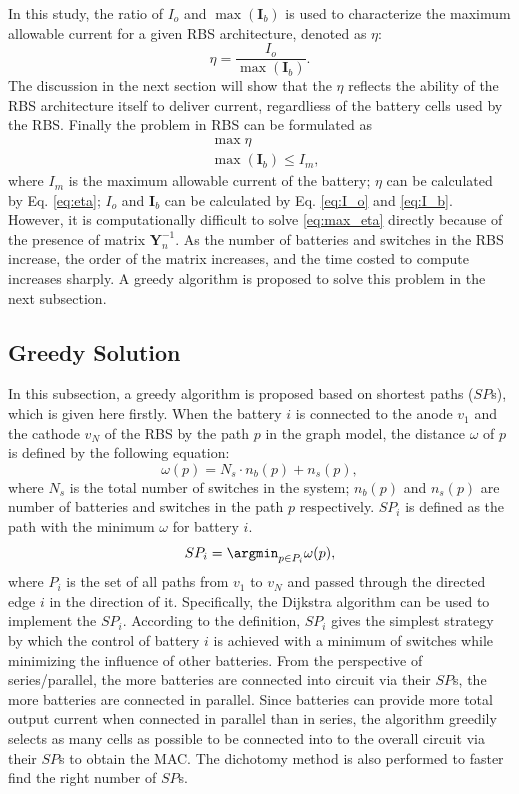 \documentclass{article}
\begin{document}
In this study, the ratio of $I_o$ and $\max (\bm{I}_b)$ is used to characterize the maximum allowable current for a given RBS architecture, denoted as $\eta$:
\begin{equation}\label{eq:eta}
    \eta = \frac{I_o}{\max (\bm{I}_b)}.
\end{equation}
The discussion in the next section will show that the $\eta$ reflects the ability of the RBS architecture itself to deliver current, regardliess of the battery cells used by the RBS.
Finally the problem in RBS can be formulated as
\begin{align}\label{eq:max_eta}
    & \max \eta \label{eq:max_eta}\\
    & \max (\bm{I}_b) \leq I_m,
\end{align}
where $I_m$ is the maximum allowable current of the battery; $\eta$ can be calculated by Eq. \ref{eq:eta}; $I_o$ and $\bm{I}_b$ can be calculated by Eq. \ref{eq:I_o} and \ref{eq:I_b}.
However, it is computationally difficult to solve \ref{eq:max_eta} directly because of the presence of matrix $\bm{Y}_n^{-1}$.
As the number of batteries and switches in the RBS increase, the order of the matrix increases, and the time costed to compute increases sharply.
A greedy algorithm is proposed to solve this problem in the next subsection.


\subsection{Greedy Solution}

In this subsection, a greedy algorithm is proposed based on shortest paths ($SP$s), which is given here firstly.
When the battery $i$ is connected to the anode $v_1$ and the cathode $v_N$ of the RBS by the path $p$ in the graph model, the distance $\omega$ of $p$ is defined by the following equation:
\begin{equation}\label{eq:weight}
    \omega(p) = N_s \cdot n_b (p) + n_s (p),
\end{equation}
where $N_s$ is the total number of switches in the system; $n_b(p)$ and $n_s(p)$ are number of batteries and switches in the path $p$ respectively.
$SP_i$ is defined as the path with the minimum $\omega$ for battery $i$.
\begin{equation}
    SP_i = \argmin_{p \in P_i} \omega(p),
\end{equation}
where $P_i$ is the set of all paths from $v_1$ to $v_N$ and passed through the directed edge $i$ in the direction of it.
Specifically, the Dijkstra algorithm can be used to implement the $SP_i$.
According to the definition, $SP_i$ gives the simplest strategy by which the control of battery $i$ is achieved with a minimum of switches while minimizing the influence of other batteries.
From the perspective of series/parallel, the more batteries are connected into circuit via their $SP$s, the more batteries are connected in parallel.
Since batteries can provide more total output current when connected in parallel than in series, the algorithm greedily selects as many cells as possible to be connected into to the overall circuit via their $SP$s to obtain the MAC.
The dichotomy method is also performed to faster find the right number of $SP$s.
\end{document}

